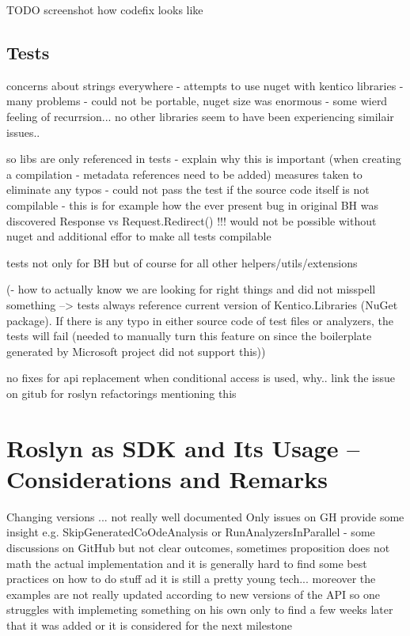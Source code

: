 \documentclass[
  digital, %
  table,   %
  lof,     %
  lot,     %
  oneside,
]{fithesis3}
\begin{document}
TODO screenshot how codefix looks like

\subsection{Tests}
concerns about strings everywhere - attempts to use nuget with kentico libraries - many problems - could not be portable, nuget size was enormous - some wierd feeling of recurrsion... no other libraries seem to have been experiencing similair issues..

so libs are only referenced in tests - explain why this is important (when creating a compilation - metadata references need to be added)
measures taken to eliminate any typos - could not pass the test if the source code itself is not compilable - this is for example how the ever present bug in original BH was discovered Response vs Request.Redirect() !!! would not be possible without nuget and additional effor to make all tests compilable

tests not only for BH but of course for all other helpers/utils/extensions

(- how to actually know we are looking for right things and did not misspell something --> tests always reference current version of Kentico.Libraries (NuGet package). If there is any typo in either source code of test files or analyzers, the tests will fail (needed to manually turn this feature on since the boilerplate generated by Microsoft project did not support this))

no fixes for api replacement when conditional access is used, why.. link the issue on gitub for roslyn refactorings mentioning this

\section{Roslyn as SDK and Its Usage -- Considerations and Remarks}
Changing versions ... not really well documented
Only issues on GH provide some insight
e.g. SkipGeneratedCoOdeAnalysis or RunAnalyzersInParallel - some discussions on GitHub but not clear outcomes, sometimes proposition does not math the actual implementation and it is generally hard to find some best practices on how to do stuff ad it is still a pretty young tech... moreover the examples are not really updated according to new versions of the API so one struggles with implemeting something on his own only to find a few weeks later that it was added or it is considered for the next milestone
\end{document}

